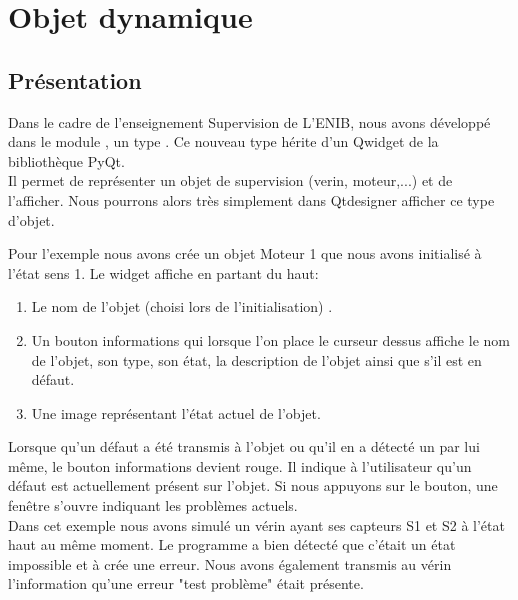 
\chapter{Objet dynamique}

\section{Présentation}

Dans le cadre de l'enseignement Supervision de L'ENIB, nous avons développé dans le module , un type . Ce nouveau type hérite d'un Qwidget de la bibliothèque PyQt.\\

Il permet de représenter un objet de supervision (verin, moteur,...) et de l'afficher. Nous pourrons alors très simplement dans Qtdesigner afficher ce type d'objet.\\ 


Pour l'exemple nous avons crée un objet Moteur 1 que nous avons initialisé à l'état sens 1. 
Le widget affiche en partant du haut:
\begin{enumerate}
    \item Le nom de l'objet (choisi lors de l'initialisation) .
    \item Un bouton informations qui lorsque l'on place le curseur dessus affiche le nom de l'objet, son type, son état, la description de l'objet ainsi que s'il est en défaut.
    \item Une image représentant l'état actuel de l'objet.
\end{enumerate}


Lorsque qu'un défaut a été transmis à l'objet ou qu'il en a détecté un par lui même, le bouton informations devient rouge. Il indique à l'utilisateur qu'un défaut est actuellement présent sur l'objet. Si nous appuyons sur le bouton, une fenêtre s'ouvre indiquant les problèmes actuels. \\

Dans cet exemple nous avons simulé un vérin ayant ses capteurs S1 et S2 à l'état haut au même moment. Le programme a bien détecté que c'était un état impossible et à crée une erreur. Nous avons également transmis au vérin l'information qu'une erreur "test problème" était présente. 
 
